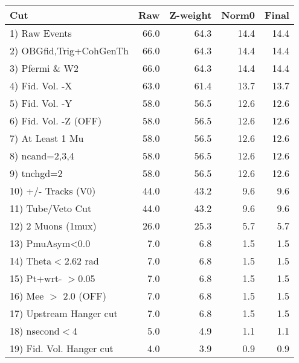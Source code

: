  \begin{table}[h!]\centering
 \begin{tabular}{||l||r|r|r|r||}
 \hline
 \hline
 Cut & Raw & Z-weight & Norm0 & Final \\
 \hline
  1) Raw Events           &        66.0 &        64.3 &        14.4 &        14.4 \\
  2) OBGfid,Trig+CohGenTh &        66.0 &        64.3 &        14.4 &        14.4 \\
  3) Pfermi \& W2         &        66.0 &        64.3 &        14.4 &        14.4 \\
  4) Fid. Vol. -X         &        63.0 &        61.4 &        13.7 &        13.7 \\
  5) Fid. Vol. -Y         &        58.0 &        56.5 &        12.6 &        12.6 \\
  6) Fid. Vol. -Z (OFF)   &        58.0 &        56.5 &        12.6 &        12.6 \\
  7) At Least 1 Mu        &        58.0 &        56.5 &        12.6 &        12.6 \\
  8) ncand=2,3,4          &        58.0 &        56.5 &        12.6 &        12.6 \\
  9) tnchgd=2             &        58.0 &        56.5 &        12.6 &        12.6 \\
 10) +/- Tracks (V0)      &        44.0 &        43.2 &         9.6 &         9.6 \\
 11) Tube/Veto Cut        &        44.0 &        43.2 &         9.6 &         9.6 \\
 12) 2 Muons (1mux)       &        26.0 &        25.3 &         5.7 &         5.7 \\
 13) PmuAsym<0.0          &         7.0 &         6.8 &         1.5 &         1.5 \\
 14) Theta$<$2.62 rad     &         7.0 &         6.8 &         1.5 &         1.5 \\
 15) Pt+wrt- $>$0.05      &         7.0 &         6.8 &         1.5 &         1.5 \\
 16) Mee $>$ 2.0  (OFF)   &         7.0 &         6.8 &         1.5 &         1.5 \\
 17) Upstream Hanger cut  &         7.0 &         6.8 &         1.5 &         1.5 \\
 18) nsecond$<$4          &         5.0 &         4.9 &         1.1 &         1.1 \\
 19) Fid. Vol. Hanger cut &         4.0 &         3.9 &         0.9 &         0.9 \\

\end{tabular}
\end{table}
